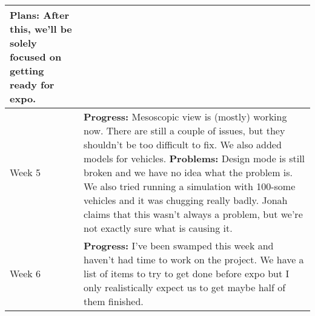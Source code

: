 \documentclass[letterpaper, 10pt, onecolumn, draftclsnofoot]{IEEEtran}
\begin{document}
\begin{center}
\begin{longtable}{|p{4cm}|p{10cm}|}
            \textbf{Plans:} After this, we'll be solely focused on getting ready for expo.\\
            \hline
            Week 5 & \textbf{Progress:} Mesoscopic view is (mostly) working now. There are still a couple of issues, but they shouldn't be too difficult to fix. We also added models for vehicles. 
            \textbf{Problems:} Design mode is still broken and we have no idea what the problem is. We also tried running a simulation with 100-some vehicles and it was chugging really badly. Jonah claims that this wasn't always a problem, but we're not exactly sure what is causing it. \\
            \hline
            Week 6 & \textbf{Progress:} I've been swamped this week and haven't had time to work on the project. We have a list of items to try to get done before expo but I only realistically expect us to get maybe half of them finished. \\
            \hline
        \end{longtable}
        \end{center}
    
\end{document}
